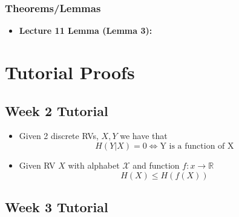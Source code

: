 \documentclass{article}
\begin{document}
\subsubsection{Theorems/Lemmas}
\begin{itemize}
    \item \textbf{Lecture 11 Lemma (Lemma 3):}
\end{itemize}



\section{Tutorial Proofs}
\subsection{Week 2 Tutorial}
\begin{itemize}
    \item Given 2 discrete RVs, \(X, Y\) we have that
    \[H(Y|X) = 0 \Longleftrightarrow \text{Y is a function of X}\]
    \item Given RV \(X\) with alphabet \(\mathcal{X}\) and function \(f: x \to \mathbb{R}\)
    \[H(X) \leq H(f(X))\]
\end{itemize}
\subsection{Week 3 Tutorial}

\end{document}
